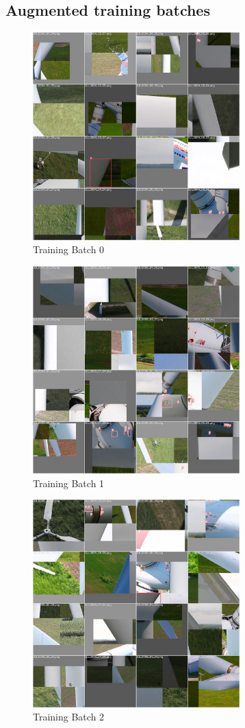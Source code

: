 \documentclass[conference]{IEEEtran}
\begin{document}
\subsection{Augmented training batches}
\begin{figure}[H]
    \centering
    \includegraphics[width=8cm]{Images/YOLOv5m/train_batch0.jpg}
    \caption{Training Batch 0}
\end{figure}
\begin{figure}[H]
    \centering
    \includegraphics[width=8cm]{Images/YOLOv5m/train_batch1.jpg}
    \caption{Training Batch 1}
\end{figure}
\begin{figure}[H]
    \centering
    \includegraphics[width=8cm]{Images/YOLOv5m/train_batch2.jpg}
    \caption{Training Batch 2}
\end{figure}
\end{document}
